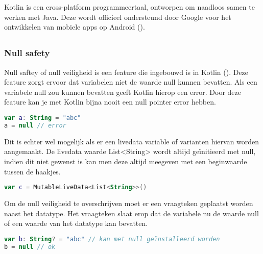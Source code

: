 \chapter{}
\label{ch:kotlin}
Kotlin is een cross-platform programmeertaal, ontworpen om naadloos samen te werken met Java. Deze wordt officieel ondersteund door Google voor het ontwikkelen van mobiele apps op Android (\cite{KOTLIN}).

\section{}
\label{sec:basisprincipes}

\subsection{Null safety}
Null saftey of null veiligheid is een feature die ingebouwd is in Kotlin (\cite{NULL_SAFETY}). Deze feature zorgt ervoor dat variabelen niet de waarde null kunnen bevatten. Als een variabele null zou kunnen bevatten geeft Kotlin hierop een error. Door deze feature kan je met Kotlin bijna nooit een null pointer error hebben. 

\begin{lstlisting}[caption=Null safty variablen, language=Kotlin]
var a: String = "abc"
a = null // error
\end{lstlisting}


Dit is echter wel mogelijk als er een livedata variable of varianten hiervan worden aangemaakt. De livedata waarde List<String> wordt altijd geïnitieerd met null, indien dit niet gewenst is kan men deze altijd meegeven met een beginwaarde tussen de haakjes.

\begin{lstlisting}[caption=Null safty LiveData, language=Kotlin]
var c = MutableLiveData<List<String>>()
\end{lstlisting}


Om de null veiligheid te overschrijven moet er een vraagteken geplaatst worden naast het datatype. Het vraagteken slaat erop dat de variabele nu de waarde null of een waarde van het datatype kan bevatten.

\begin{lstlisting}[caption=Overschrijf null safty, language=Kotlin]
var b: String? = "abc" // kan met null geïnstalleerd worden
b = null // ok
\end{lstlisting}


